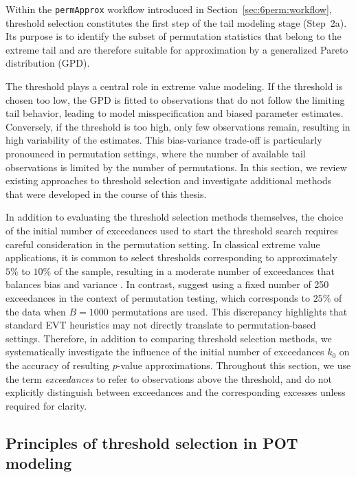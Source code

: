 Within the \texttt{permApprox} workflow introduced in Section~\ref{sec:6perm:workflow}, threshold selection constitutes the first step of the tail modeling stage (Step~2a). Its purpose is to identify the subset of permutation statistics that belong to the extreme tail and are therefore suitable for approximation by a generalized Pareto distribution (GPD).

The threshold plays a central role in extreme value modeling. If the threshold is chosen too low, the GPD is fitted to observations that do not follow the limiting tail behavior, leading to model misspecification and biased parameter estimates. Conversely, if the threshold is too high, only few observations remain, resulting in high variability of the estimates. This bias-variance trade-off is particularly pronounced in permutation settings, where the number of available tail observations is limited by the number of permutations. In this section, we review existing approaches to threshold selection and investigate additional methods that were developed in the course of this thesis.

In addition to evaluating the threshold selection methods themselves, the choice of the initial number of exceedances used to start the threshold search requires careful consideration in the permutation setting. In classical extreme value applications, it is common to select thresholds corresponding to approximately $5\%$ to $10\%$ of the sample, resulting in a moderate number of exceedances that balances bias and variance \citep{coles2001introduction}. In contrast, \citet{knijnenburg2009fewer} suggest using a fixed number of 250 exceedances in the context of permutation testing, which corresponds to $25\%$ of the data when $B=1000$ permutations are used. This discrepancy highlights that standard EVT heuristics may not directly translate to permutation-based settings. Therefore, in addition to comparing threshold selection methods, we systematically investigate the influence of the initial number of exceedances $k_0$ on the accuracy of resulting $p$-value approximations. Throughout this section, we use the term \emph{exceedances} to refer to observations above the threshold, and do not explicitly distinguish between exceedances and the corresponding excesses unless required for clarity.

\subsection{Principles of threshold selection in POT modeling}
\label{sec:6perm:threshold:principles}

